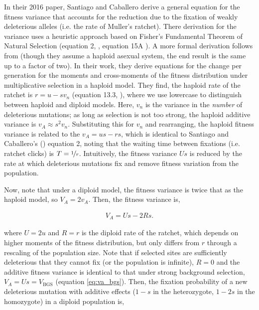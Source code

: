 \documentclass[11pt]{article}
\begin{document}
In their 2016 paper, Santiago and Caballero derive a general equation for the
fitness variance that accounts for the reduction due to the fixation of weakly
deleterious alleles (i.e. the rate of Muller's ratchet). There derivation for
the variance uses a heuristic approach based on Fisher's Fundamental Theorem of
Natural Selection (equation 2, \cite{Santiago2016-mu}, equation 15A
\cite{Garcia-Dorado2007-jj}). A more formal derivation follows from
\textcite{Higgs1995-xc} (though they assume a haploid asexual system, the end
result is the same up to a factor of two). In their work, they derive equations
for the change per generation for the moments and cross-moments of the fitness
distribution under multiplicative selection in a haploid model. They find, the
haploid rate of the ratchet is $r = u - s v_n$ (equation 13.3,
\cite{Higgs1995-xc}), where we use lowercase to distinguish between haploid and
diploid models. Here, $v_n$ is the variance in the \emph{number} of deleterious
mutations; as long as selection is not too strong, the haploid additive
variance is $v_{A} \approx s^2 v_n$. Substituting this for $v_n$ and
rearranging, the haploid fitness variance is related to the $v_A = us - rs$,
which is identical to Santiago and Caballero's (\citeyear{Santiago2016-mu})
equation 2, noting that the waiting time between fixations (i.e. ratchet
clicks) is $T = \nicefrac{1}{r}$. Intuitively, the fitness variance $Us$ is
reduced by the rate at which deleterious mutations fix and remove fitness
variation from the population.

Now, note that under a diploid model, the fitness variance is twice that as the
haploid model, so $V_A = 2 v_A$. Then, the fitness variance is,

\begin{align}
  \label{supp-eq:Va}
  V_{A} = Us - 2Rs. 
\end{align}

where $U = 2u$ and $R=r$ is the diploid rate of the ratchet, which depends on
higher moments of the fitness distribution, but only differs from $r$ through a
rescaling of the population size. Note that if selected sites are sufficiently
deleterious that they cannot fix (or the population is infinite), $R=0$ and the
additive fitness variance is identical to that under strong background
selection, $V_A = Us = V_\text{BGS}$ (equation \eqref{eq:va_bgs}). Then, the
fixation probability of a new deleterious mutation with additive effects ($1-s$
in the heterozygote, $1-2s$ in the homozygote) in a diploid population is,
\end{document}
